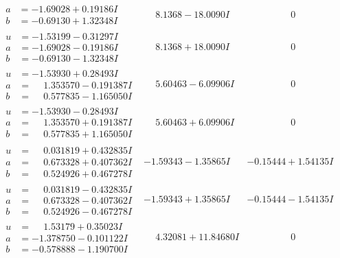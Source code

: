 \documentclass[1p]{elsarticle_modified}
\theoremstyle{definition}
\begin{document}
$$\begin{array}{c|c|c}
\begin{aligned}
a &= -1.69028 + 0.19186 I \\
b &= -0.69130 + 1.32348 I\end{aligned}
 & \phantom{-}8.1368 - 18.0090 I & \phantom{-0.000000 } 0 \\ \hline\begin{aligned}
u &= -1.53199 - 0.31297 I \\
a &= -1.69028 - 0.19186 I \\
b &= -0.69130 - 1.32348 I\end{aligned}
 & \phantom{-}8.1368 + 18.0090 I & \phantom{-0.000000 } 0 \\ \hline\begin{aligned}
u &= -1.53930 + 0.28493 I \\
a &= \phantom{-}1.353570 - 0.191387 I \\
b &= \phantom{-}0.577835 - 1.165050 I\end{aligned}
 & \phantom{-}5.60463 - 6.09906 I & \phantom{-0.000000 } 0 \\ \hline\begin{aligned}
u &= -1.53930 - 0.28493 I \\
a &= \phantom{-}1.353570 + 0.191387 I \\
b &= \phantom{-}0.577835 + 1.165050 I\end{aligned}
 & \phantom{-}5.60463 + 6.09906 I & \phantom{-0.000000 } 0 \\ \hline\begin{aligned}
u &= \phantom{-}0.031819 + 0.432835 I \\
a &= \phantom{-}0.673328 + 0.407362 I \\
b &= \phantom{-}0.524926 + 0.467278 I\end{aligned}
 & -1.59343 - 1.35865 I & -0.15444 + 1.54135 I \\ \hline\begin{aligned}
u &= \phantom{-}0.031819 - 0.432835 I \\
a &= \phantom{-}0.673328 - 0.407362 I \\
b &= \phantom{-}0.524926 - 0.467278 I\end{aligned}
 & -1.59343 + 1.35865 I & -0.15444 - 1.54135 I \\ \hline\begin{aligned}
u &= \phantom{-}1.53179 + 0.35023 I \\
a &= -1.378750 - 0.101122 I \\
b &= -0.578888 - 1.190700 I\end{aligned}
 & \phantom{-}4.32081 + 11.84680 I & \phantom{-0.000000 } 0 \\ \hline\begin{aligned}

\end{aligned}
\end{array}$$
\end{document}
